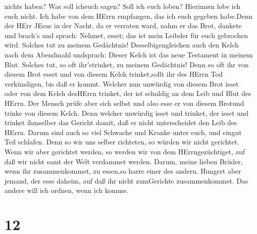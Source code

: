 nichts haben? Was soll icheuch sagen? Soll ich euch loben? Hierinnen
lobe ich euch nicht.  Ich habe von dem HErrn empfangen, das
ich euch gegeben habe.Denn der HErr JEsus in der Nacht, da er verraten
ward, nahm er das Brot,  dankete und brach's und sprach:
Nehmet, esset; das ist mein Leibder für euch gebrochen wird. Solches tut
zu meinem Gedächtnis!  Desselbigengleichen auch den Kelch
nach dem Abendmahl undsprach: Dieser Kelch ist das neue Testament in
meinem Blut. Solches tut, so oft ihr'strinket, zu meinem Gedächtnis!
 Denn so oft ihr von diesem Brot esset und von diesem Kelch
trinket,sollt ihr des HErrn Tod verkündigen, bis daß er kommt.
 Welcher nun unwürdig von diesem Brot isset oder von dem
Kelch desHErrn trinket, der ist schuldig an dem Leib und Blut des HErrn.
 Der Mensch prüfe aber sich selbst und also esse er von
diesem Brotund trinke von diesem Kelch.  Denn welcher
unwürdig isset und trinket, der isset und trinket ihmselber das Gericht
damit, daß er nicht unterscheidet den Leib des HErrn. 
Darum sind auch so viel Schwache und Kranke unter euch, und eingut Teil
schlafen.  Denn so wir uns selber richteten, so würden wir
nicht gerichtet.  Wenn wir aber gerichtet werden, so werden
wir von dem HErrngezüchtiget, auf daß wir nicht samt der Welt verdammet
werden.  Darum, meine lieben Brüder, wenn ihr
zusammenkommet, zu essen,so harre einer des andern. 
Hungert aber jemand, der esse daheim, auf daß ihr nicht zumGerichte
zusammenkommet. Das andere will ich ordnen, wenn ich komme.

\hypertarget{section-11}{%
\section{12}\label{section-11}}

